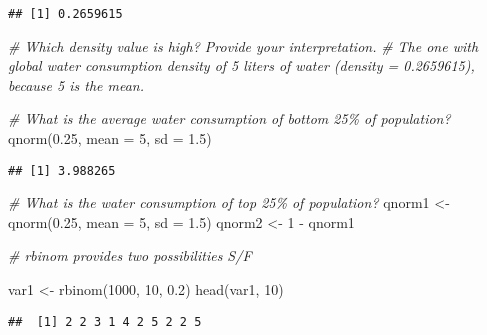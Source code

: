 \documentclass[
]{article}
\newenvironment{Shaded}{\begin{snugshade}}{\end{snugshade}}
\newcommand{\AttributeTok}[1]{\textcolor[rgb]{0.77,0.63,0.00}{#1}}
\newcommand{\CommentTok}[1]{\textcolor[rgb]{0.56,0.35,0.01}{\textit{#1}}}
\newcommand{\DecValTok}[1]{\textcolor[rgb]{0.00,0.00,0.81}{#1}}
\newcommand{\FloatTok}[1]{\textcolor[rgb]{0.00,0.00,0.81}{#1}}
\newcommand{\FunctionTok}[1]{\textcolor[rgb]{0.00,0.00,0.00}{#1}}
\newcommand{\NormalTok}[1]{#1}
\newcommand{\OtherTok}[1]{\textcolor[rgb]{0.56,0.35,0.01}{#1}}
\newcommand{\SpecialCharTok}[1]{\textcolor[rgb]{0.00,0.00,0.00}{#1}}
\begin{document}
\begin{verbatim}
## [1] 0.2659615
\end{verbatim}

\begin{Shaded}
\begin{Highlighting}[]
\CommentTok{\# Which density value is high? Provide your interpretation. }
\CommentTok{\#\textquotesingle{} The one with global water consumption density of 5 liters of water (density = 0.2659615), because 5 is the mean.}
\end{Highlighting}
\end{Shaded}

\begin{Shaded}
\begin{Highlighting}[]
\CommentTok{\# What is the average water consumption of bottom 25\% of population?  }
\FunctionTok{qnorm}\NormalTok{(}\FloatTok{0.25}\NormalTok{, }\AttributeTok{mean =} \DecValTok{5}\NormalTok{, }\AttributeTok{sd =} \FloatTok{1.5}\NormalTok{)}
\end{Highlighting}
\end{Shaded}

\begin{verbatim}
## [1] 3.988265
\end{verbatim}

\begin{Shaded}
\begin{Highlighting}[]
\CommentTok{\# What is the water consumption of top 25\% of population?  }
\NormalTok{qnorm1 }\OtherTok{\textless{}{-}} \FunctionTok{qnorm}\NormalTok{(}\FloatTok{0.25}\NormalTok{, }\AttributeTok{mean =} \DecValTok{5}\NormalTok{, }\AttributeTok{sd =} \FloatTok{1.5}\NormalTok{)}
\NormalTok{qnorm2 }\OtherTok{\textless{}{-}} \DecValTok{1} \SpecialCharTok{{-}}\NormalTok{ qnorm1}
\end{Highlighting}
\end{Shaded}

\begin{Shaded}
\begin{Highlighting}[]
\CommentTok{\# rbinom provides two possibilities S/F}

\NormalTok{var1 }\OtherTok{\textless{}{-}} \FunctionTok{rbinom}\NormalTok{(}\DecValTok{1000}\NormalTok{, }\DecValTok{10}\NormalTok{, }\FloatTok{0.2}\NormalTok{)}
\FunctionTok{head}\NormalTok{(var1, }\DecValTok{10}\NormalTok{)}
\end{Highlighting}
\end{Shaded}

\begin{verbatim}
##  [1] 2 2 3 1 4 2 5 2 2 5
\end{verbatim}
\end{document}
